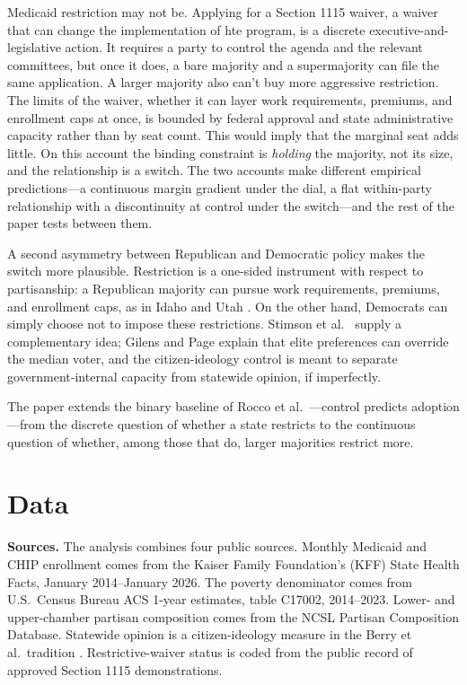 \documentclass[9pt,twoside]{pnas-new}
\begin{document}
Medicaid restriction may not be. Applying for a Section 1115 waiver, a waiver that can change the implementation of hte program, is a discrete executive-and-legislative action. It requires a party to control the agenda and the relevant committees, but once it does, a bare majority and a supermajority can file the same application. A larger majority also can't buy more aggressive restriction. The limits of the waiver, whether it can layer work requirements, premiums, and enrollment caps at once, is bounded by federal approval and state administrative capacity rather than by seat count. This would imply that the marginal seat adds little. On this account the binding constraint is \emph{holding} the majority, not its size, and the relationship is a switch. The two accounts make different empirical predictions---a continuous margin gradient under the dial, a flat within-party relationship with a discontinuity at control under the switch---and the rest of the paper tests between them.

A second asymmetry between Republican and Democratic policy makes the switch more plausible. Restriction is a one-sided instrument with respect to partisanship: a Republican majority can pursue work requirements, premiums, and enrollment caps, as in Idaho and Utah \cite{jarlenski2020}. On the other hand, Democrats can simply choose not to impose these restrictions. Stimson et al.\ \cite{stimson1995} supply a complementary idea; Gilens and Page \cite{gilenspage2014} explain that elite preferences can override the median voter, and the citizen-ideology control is meant to separate government-internal capacity from statewide opinion, if imperfectly. 

The paper extends the binary baseline of Rocco et al.\ \cite{rocco2020}---control predicts adoption---from the discrete question of whether a state restricts to the continuous question of whether, among those that do, larger majorities restrict more.

\section*{Data}

\textbf{Sources.} The analysis combines four public sources. Monthly Medicaid and CHIP enrollment comes from the Kaiser Family Foundation's (KFF) State Health Facts, January 2014--January 2026. The poverty denominator comes from U.S.\ Census Bureau ACS 1-year estimates, table C17002, 2014--2023. Lower- and upper-chamber partisan composition comes from the NCSL Partisan Composition Database. Statewide opinion is a citizen-ideology measure in the Berry et al.\ tradition \cite{berry1998}. Restrictive-waiver status is coded from the public record of approved Section 1115 demonstrations.
\end{document}
